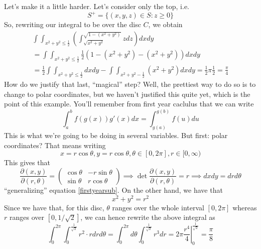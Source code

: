 \documentclass{article}
\newcommand{\prt}[2]{\frac{\partial #1}{\partial #2}}
\begin{document}
\begin{enumerate}
  Let's make it a little harder. Let's consider only the top, i.e.
  \begin{equation}S^+ = \{(x, y, z) \in S : z \geq 0\}\end{equation}
  So, rewriting our integral to be over the disc \(C\), we obtain
  \begin{equation}
  \begin{split}
    \int\int_{x^2 + y^2 \leq \frac{1}{2}}\left(\int_{\sqrt{x^2 + y^2}}^{\sqrt{1 - (x^2 + y^2)}}zdz\right)dxdy \\
    = \int\int_{x^2 + y^2 \leq \frac{1}{2}}\frac{1}{2}(1 - (x^2 + y^2) - (x^2 + y^2))dxdy \\
    = \frac{1}{2}\int\int_{x^2 + y^2 \leq \frac{1}{2}}dxdy - \int\int_{x^2 + y^2 - \frac{1}{2}}(x^2 + y^2)dxdy = \frac{1}{2}\pi\frac{1}{2} = \frac{\pi}{4}
  \end{split}
  \end{equation}
  How do we justify that last, ``magical'' step? Well, the prettiest way to do so is to change to polar coordinates, but we haven't justified this quite yet, which is the point of this example. You'll remember from first year caclulus that we can write
  \begin{equation}
    \int_a^bf(g(x))g'(x)dx = \int_{g(a)}^{g(b)}f(u)du
    \label{firstyearsub}
  \end{equation}
  This is what we're going to be doing in several variables. But first: polar coordinates? That means writing
  \begin{equation}
    x = r\cos\theta, y = r\cos\theta, \theta \in [0, 2\pi], r \in [0, \infty)
  \end{equation}
  This gives that
  \begin{equation}
    \prt{(x, y)}{(r, \theta)} = \begin{pmatrix}\cos\theta & -r\sin\theta \\ \sin\theta & r\cos\theta\end{pmatrix} \implies \det\prt{(x, y)}{(r, \theta)} = r \implies dxdy = drd\theta
  \end{equation}
  ``generalizing'' equation \ref{firstyearsub}. On the other hand, we have that
  \begin{equation}
    x^2 + y^2 = r^2
  \end{equation}
  Since we have that, for this disc, \(\theta\) ranges over the whole interval \([0, 2\pi]\) whereas \(r\) ranges over \([0, 1/\sqrt{2}]\), we can hence rewrite the above integral as
  \begin{equation}
    \int_0^{2\pi}\int_0^{\frac{1}{\sqrt{2}}}r^2 \cdot rdrd\theta =
    \int_0^{2\pi}d\theta\int_0^{\frac{1}{\sqrt{2}}}r^3dr =
    \left.2\pi\frac{r^4}{4}\right|_{0}^{\frac{1}{\sqrt{2}}} = \frac{\pi}{8}
  \end{equation}

\end{enumerate}
\end{document}
